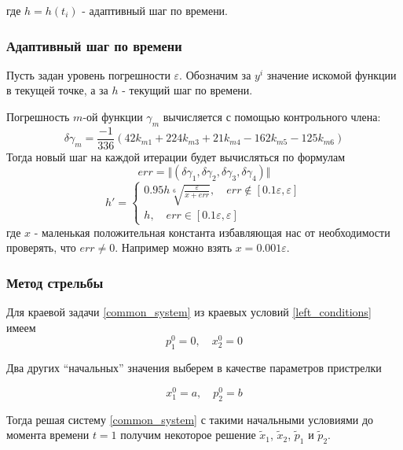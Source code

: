 \documentclass[a4paper,12pt]{article}
\begin{document}
где \(h=h(t_i)\) - адаптивный шаг по времени.

\subsubsection*{Адаптивный шаг по времени}

Пусть задан уровень погрешности \(\varepsilon\). Обозначим за \(y^i\)
значение искомой функции в текущей точке, а за \(h\) - текущий шаг по
времени.

Погрешность \(m\)-ой функции \(\gamma_{m}\) вычисляется с помощью контрольного члена:
\begin{equation*}
  \delta\gamma_{m} = \frac{-1}{336}\left(42 k_{m1}+224k_{m3}+21k_{m4}-162 k_{m5}-125 k_{m6}\right)
\end{equation*}
Тогда новый шаг на каждой итерации будет вычисляться по формулам
\begin{equation*}
  err = \Vert (\delta\gamma_{1}, \delta\gamma_{2}, \delta\gamma_{3}, \delta\gamma_{4})\Vert
\end{equation*}
\begin{equation*}
  h'=\begin{cases}
    0.95 h \sqrt[6]{\frac{\varepsilon}{x+err}}, \quad err \not\in [0.1 \varepsilon, \varepsilon]\\
    h, \quad  err \in [0.1 \varepsilon, \varepsilon]
  \end{cases}
\end{equation*}
где \(x\) - маленькая
положительная константа избавляющая нас от необходимости проверять, что
\(err \neq 0\). Например можно взять \(x=0.001 \varepsilon\).

\subsubsection*{Метод стрельбы}

Для краевой задачи \cref{common_system} из краевых условий \cref{left_conditions} имеем
\begin{equation*}
  p_1^0=0, \quad x_2^0=0
\end{equation*}

Два других ``начальных'' значения выберем в качестве параметров
пристрелки

\begin{equation*}
  x_1^0=a, \quad p_2^0=b
\end{equation*}

Тогда решая систему \cref{common_system} с такими начальными условиями до момента времени \(t=1\) получим некоторое решение \(\tilde{x}_1\), \(\tilde{x}_2\), \(\tilde{p}_1\) и \(\tilde{p}_2\).
\end{document}
